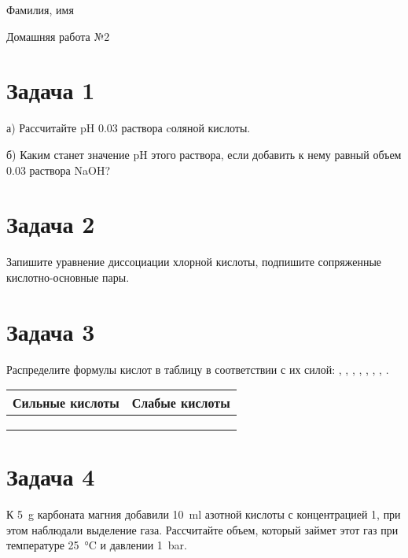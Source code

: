 \documentclass[a4paper,12pt]{article}
\begin{document}
\newpage
\begin{minipage}[t]{\textwidth}
\vspace*{0pt} %
\leavevmode Фамилия, имя \hrulefill
\begin{center}
  \LARGE Домашняя работа №2
\end{center}
\end{minipage}

\setlength{\parindent}{15pt}
\section*{Задача 1}
а) Рассчитайте pH \SI{0.03}{\moleperliter} раствора cоляной кислоты.\par
\vspace{5\baselineskip}
б) Каким станет значение pH этого раствора, если добавить к нему равный объем \SI{0.03}{\moleperliter} раствора NaOH?\par
\vspace{5\baselineskip}
\section*{Задача 2}
Запишите уравнение диссоциации хлорной кислоты, подпишите сопряженные кислотно-основные пары.\par
\vspace{0.5\baselineskip}
{\centering{}\par}
\vspace*{2\baselineskip}
\section*{Задача 3}
Распределите формулы кислот в таблицу в соответствии с их силой: , , , , , , , .\par
\vspace{0.5\baselineskip}
\begin{tabularx}{\textwidth}{|Y|Y|}
\hline
Сильные кислоты & Слабые кислоты\\ 
\hline
 & \\ 
 & \\ 
 & \\ 
\hline
\end{tabularx}
\section*{Задача 4}
К \SI{5}{\gram} карбоната магния добавили \SI{10}{\ml} азотной кислоты с концентрацией \SI{1}{\moleperliter}, при этом наблюдали выделение газа. Рассчитайте объем, который займет этот газ при температуре \SI{25}{\celsius} и давлении \SI{1}{\bar}.
\end{document}
